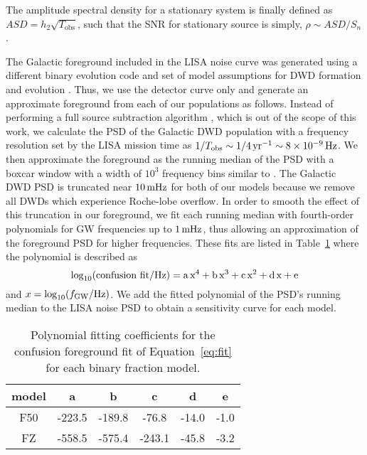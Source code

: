 \documentclass[twocolumn, linenumbers]{aastex631}
\begin{document}
The amplitude spectral density for a stationary system is finally defined as $ASD = h_{2} \sqrt{T_\text{obs}}$, such that the SNR for stationary source is simply, $\rho \sim ASD/S_n$.

The Galactic foreground included in the \citet{Robson2019} LISA noise curve was generated using a different binary evolution code and set of model assumptions for DWD formation and evolution \citep{Toonen2012, Korol2017}. Thus, we use the detector curve only and generate an approximate foreground from each of our populations as follows. Instead of performing a full source subtraction algorithm \citep[e.g.][]{Littenberg2020}, which is out of the scope of this work, we calculate the PSD of the Galactic DWD population with a frequency resolution set by the LISA mission time as $1/T_{\rm{obs}}\sim1/4\,\rm{yr}^{-1}\sim8\times10^{-9}\,\rm{Hz}$. We then approximate the foreground as the running median of the PSD with a boxcar window with a width of $10^3$ frequency bins similar to \citet{Benacquista2006}. The Galactic DWD PSD is truncated near $10\,\rm{mHz}$ for both of our models because we remove all DWDs which experience Roche-lobe overflow. In order to smooth the effect of this truncation in our foreground, we fit each running median with fourth-order polynomials for GW frequencies up to $1\,\rm{mHz}$, thus allowing an approximation of the foreground PSD for higher frequencies. These fits are listed in Table~\ref{tbl:fits} where the polynomial is described as
\begin{equation}
\label{eq:fit}
    \log_{10}(\rm{confusion\ fit}/\rm{Hz}) = a\,x^4 + b\,x^3 + c\,x^2 + d\,x + e
\end{equation}
\noindent and $x=\log_{10}(f_{\rm{GW}}/\rm{Hz})$. We add the fitted polynomial of the PSD's running median to the LISA noise PSD to obtain a sensitivity curve for each model. 

\begin{table}[]
    \centering
    \begin{tabular}{|c|c|c|c|c|c|}
       \hline
       model & a & b & c & d & e \\
       \hline
       \hline
       F50 & -223.5 & -189.8 & -76.8 & -14.0 & -1.0 \\
       \hline
       FZ & -558.5 & -575.4 & -243.1 & -45.8 & -3.2 \\
       \hline
    \end{tabular}
    \caption{Polynomial fitting coefficients for the confusion foreground fit of Equation~\ref{eq:fit} for each binary fraction model.}
    \label{tbl:fits}
\end{table}
\end{document}
